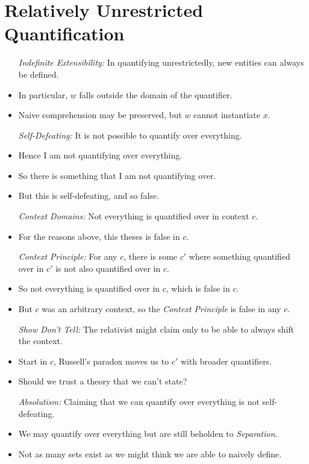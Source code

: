 \documentclass[a4paper, 11pt]{article} %
\begin{document}
\section*{Relatively Unrestricted Quantification}

\begin{itemize}
  \item[\it Indefinite Extensibility:] In quantifying unrestrictedly, new entities can always be defined.
    \item In particular, $w$ falls outside the domain of the quantifier.  
    \item Naive comprehension may be preserved, but $w$ cannot instantiate $x$.
  \item[\it Self-Defeating:] It is not possible to quantify over everything. 
    \item Hence I am not quantifying over everything.
    \item So there is something that I am not quantifying over.
    \item But this is self-defeating, and so false.
  \item[\it Context Domains:] Not everything is quantified over in context $c$.
    \item For the reasons above, this theses is false in $c$.
  \item[\it Context Principle:] For any $c$, there is some $c'$ where something quantified over in $c'$ is not also quantified over in $c$.
    \item So not everything is quantified over in $c$, which is false in $c$.
    \item But $c$ was an arbitrary context, so the \textit{Context Principle} is false in any $c$. 
  \item[\it Show Don't Tell:] The relativist might claim only to be able to always shift the context.
    \item Start in $c$, Russell's paradox moves us to $c'$ with broader quantifiers. 
    \item Should we trust a theory that we can't state?
  \item[\it Absolutism:] Claiming that we can quantify over everything is not self-defeating.
    \item We may quantify over everything but are still beholden to \textit{Separation}.
    \item Not as many sets exist as we might think we are able to naively define.
\end{itemize}
\end{document}
